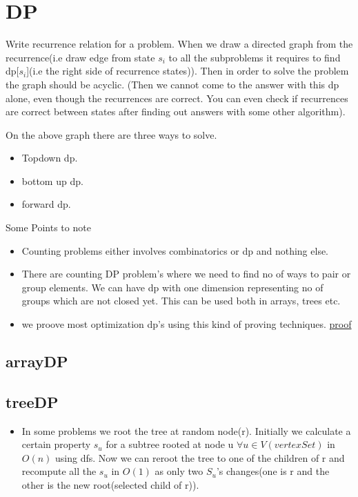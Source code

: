 \documentclass[../Notes.tex]{subfiles}
\begin{document}
\chapter{DP}

Write recurrence relation for a problem. When we draw a directed graph from the recurrence(i.e draw edge from state $s_i$ to all the subproblems it requires to find dp[$s_i$](i.e the right side of recurrence states)). Then in order to solve the problem the graph should be acyclic. (Then we cannot come to the answer with this dp alone, even though the recurrences are correct. You can even check if recurrences are correct between states after finding out answers with some other algorithm).

On the above graph there are three ways to solve.
\begin{itemize}
	\item Topdown dp.
	\item bottom up dp.
	\item forward dp.
\end{itemize}	
Some Points to note
\begin{itemize}
	\item Counting problems either involves combinatorics or dp and nothing else.
	\item There are counting DP problem's where we need to find no of ways to pair or group elements. We can have dp with one dimension representing no of groups which are not closed yet. This can be used both in arrays, trees etc.  
	\item we proove most optimization dp's using this kind of proving techniques.
	\href{Material/dpproof.pdf}{proof}
\end{itemize}

\section{arrayDP}

\section{treeDP}
\begin{itemize}
	\item In some problems we root the tree at random node(r). Initially we calculate a certain property $s_{u}$ for a subtree rooted at node u $\forall u \in V(vertexSet)$ in $O(n)$ using dfs. Now we can reroot the tree to one of the children of r and recompute all the $s_u$ in $O(1)$ as only two $S_u$'s changes(one is r and the other is the new root(selected child of r)).
\end{itemize}
\end{document}

